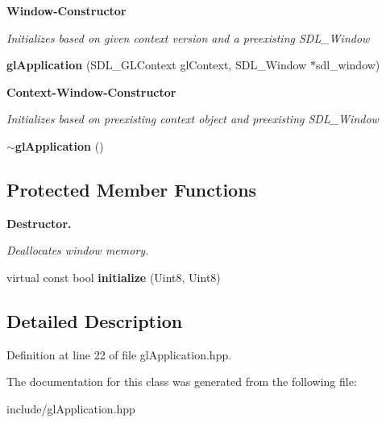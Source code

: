 \begin{Indent}{\bf Window-\/\+Constructor}\par
{\em Initializes based on given context version and a preexisting S\+D\+L\+\_\+\+Window }\begin{DoxyCompactItemize}
\item 
\hypertarget{classngl_1_1gl_application_a97f8ad7bd2690bc2f36fa7ac8e113a2a}{}{\bfseries gl\+Application} (S\+D\+L\+\_\+\+G\+L\+Context gl\+Context, S\+D\+L\+\_\+\+Window $\ast$sdl\+\_\+window)\label{classngl_1_1gl_application_a97f8ad7bd2690bc2f36fa7ac8e113a2a}

\end{DoxyCompactItemize}
\end{Indent}
\begin{Indent}{\bf Context-\/\+Window-\/\+Constructor}\par
{\em Initializes based on preexisting context object and preexisting S\+D\+L\+\_\+\+Window }\begin{DoxyCompactItemize}
\item 
\hypertarget{classngl_1_1gl_application_a512051cfcb3820efeaa9aabf09011541}{}{\bfseries $\sim$gl\+Application} ()\label{classngl_1_1gl_application_a512051cfcb3820efeaa9aabf09011541}

\end{DoxyCompactItemize}
\end{Indent}
\subsection*{Protected Member Functions}
\begin{Indent}{\bf Destructor.}\par
{\em Deallocates window memory. }\begin{DoxyCompactItemize}
\item 
\hypertarget{classngl_1_1gl_application_a7f0c954422c52ff8a408f954f9aa7a34}{}virtual const bool {\bfseries initialize} (Uint8, Uint8)\label{classngl_1_1gl_application_a7f0c954422c52ff8a408f954f9aa7a34}

\end{DoxyCompactItemize}
\end{Indent}


\subsection{Detailed Description}


Definition at line 22 of file gl\+Application.\+hpp.



The documentation for this class was generated from the following file\+:\begin{DoxyCompactItemize}
\item 
include/gl\+Application.\+hpp\end{DoxyCompactItemize}
